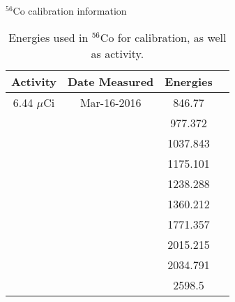 \begin{table}[]
    \centering
    \caption{$^56$Co calibration information}
    \begin{tabular}{c|c|c|c}
         Activity & Date Measured & Energies  \\ \hline
         6.44 $\mu$Ci & Mar-16-2016 & 846.77 \\
         & & 977.372 \\
         & & 1037.843 \\
         & & 1175.101 \\
         & & 1238.288 \\
         & & 1360.212 \\
         & & 1771.357 \\
         & & 2015.215 \\
         & & 2034.791 \\
         & & 2598.5 \\
    \end{tabular}
    \caption{Energies used in $^{56}$Co for calibration, as well as activity.}
    \label{tab:Co_Energy}
\end{table}